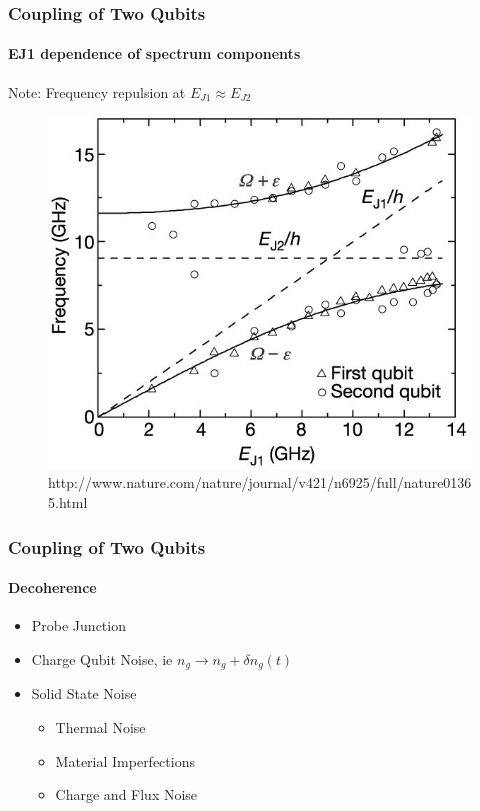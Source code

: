 \documentclass{beamer}
\begin{document}
\begin{frame}
    \frametitle{Coupling of Two Qubits}
    \framesubtitle{EJ1 dependence of spectrum components}
    \begin{block}{}
        \centering
        Note: Frequency repulsion at $E_{J1} \approx E_{J2}$
    \end{block}
    \begin{figure}[ht!]
        \centering
        \includegraphics[height=0.6\textheight]{img/freq-vs-ej1.jpg}
        \caption{http://www.nature.com/nature/journal/v421/n6925/full/nature01365.html}
    \end{figure}
\end{frame}


\begin{frame}
    \frametitle{Coupling of Two Qubits}
    \framesubtitle{Decoherence}
    \centering
    \begin{itemize}
        \item Probe Junction
        \item Charge Qubit Noise, ie $n_g \rightarrow n_g + \delta n_g(t)$
        \item Solid State Noise
        \begin{itemize}
            \item Thermal Noise
            \item Material Imperfections
            \item Charge and Flux Noise
        \end{itemize}
    \end{itemize}
\end{frame}
\end{document}
